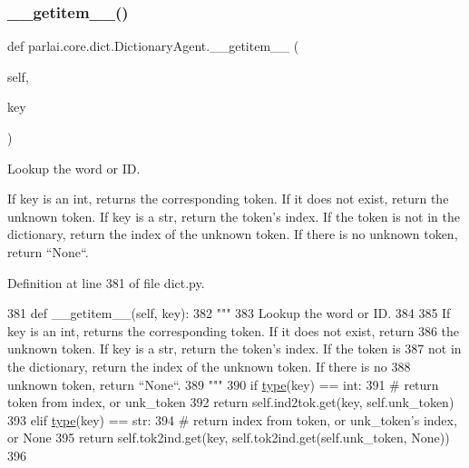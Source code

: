 \subsubsection{\texorpdfstring{\+\_\+\+\_\+getitem\+\_\+\+\_\+()}{\_\_getitem\_\_()}}
{\footnotesize\ttfamily def parlai.\+core.\+dict.\+Dictionary\+Agent.\+\_\+\+\_\+getitem\+\_\+\+\_\+ (\begin{DoxyParamCaption}\item[{}]{self,  }\item[{}]{key }\end{DoxyParamCaption})}

\begin{DoxyVerb}Lookup the word or ID.

If key is an int, returns the corresponding token. If it does not exist, return
the unknown token. If key is a str, return the token's index. If the token is
not in the dictionary, return the index of the unknown token. If there is no
unknown token, return ``None``.
\end{DoxyVerb}
 

Definition at line 381 of file dict.\+py.


\begin{DoxyCode}
381     \textcolor{keyword}{def }\_\_getitem\_\_(self, key):
382         \textcolor{stringliteral}{"""}
383 \textcolor{stringliteral}{        Lookup the word or ID.}
384 \textcolor{stringliteral}{}
385 \textcolor{stringliteral}{        If key is an int, returns the corresponding token. If it does not exist, return}
386 \textcolor{stringliteral}{        the unknown token. If key is a str, return the token's index. If the token is}
387 \textcolor{stringliteral}{        not in the dictionary, return the index of the unknown token. If there is no}
388 \textcolor{stringliteral}{        unknown token, return ``None``.}
389 \textcolor{stringliteral}{        """}
390         \textcolor{keywordflow}{if} \hyperlink{namespaceparlai_1_1agents_1_1tfidf__retriever_1_1build__tfidf_ad5dfae268e23f506da084a9efb72f619}{type}(key) == int:
391             \textcolor{comment}{# return token from index, or unk\_token}
392             \textcolor{keywordflow}{return} self.ind2tok.get(key, self.unk\_token)
393         \textcolor{keywordflow}{elif} \hyperlink{namespaceparlai_1_1agents_1_1tfidf__retriever_1_1build__tfidf_ad5dfae268e23f506da084a9efb72f619}{type}(key) == str:
394             \textcolor{comment}{# return index from token, or unk\_token's index, or None}
395             \textcolor{keywordflow}{return} self.tok2ind.get(key, self.tok2ind.get(self.unk\_token, \textcolor{keywordtype}{None}))
396 
\end{DoxyCode}
\mbox{\label{classparlai_1_1core_1_1dict_1_1DictionaryAgent_a1c686bb8b03cf09dbd43943d268c2410}} 
